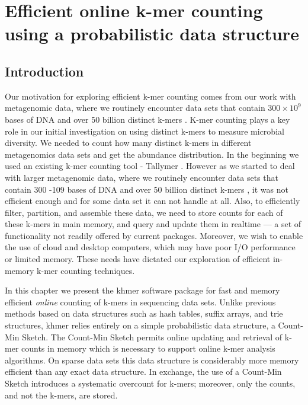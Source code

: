 \chapter{Efficient online k-mer counting using a probabilistic data structure}


\section{Introduction}

Our motivation for exploring efficient k-mer counting comes from our
work with metagenomic data, where we routinely encounter data sets
that contain $300 \times 10^9$ bases of DNA and over 50 billion
distinct k-mers \cite{Howe2012}. 
K-mer counting plays a key role in our initial investigation on using distinct 
k-mers to measure microbial diversity. We needed to count how many distinct 
k-mers in different metagenomics data sets and get the abundance distribution. 
In the beginning we used an existing k-mer counting tool - Tallymer \cite{Kurtz2008}
. However as we started to deal with 
larger metagenomic data, where we routinely encounter data sets that contain 
300 -109 bases of DNA and over 50 billion distinct k-mers \cite{Howe2012},
it was not efficient enough and for some data set it can not handle at all. 
 Also, to efficiently filter, partition,
and assemble these data, we need to store counts for each of these
k-mers in main memory, and query and update them in realtime --- a set
of functionality not readily offered by current packages.  Moreover,
we wish to enable the use of cloud and desktop computers, which may
have poor I/O performance or limited memory. These needs have dictated
our exploration of efficient in-memory k-mer counting techniques.

In this chapter we present the khmer
software package for fast and memory efficient {\em online} counting
of k-mers in sequencing data sets. Unlike previous methods based on
data structures such as hash tables, suffix arrays, and trie
structures, khmer relies entirely on a simple probabilistic data
structure, a Count-Min Sketch.  The Count-Min Sketch permits online
updating and retrieval of k-mer counts in memory which is necessary to
support online k-mer analysis algorithms.  On sparse data sets this
data structure is considerably more memory efficient than any exact
data structure.  In exchange, the use of a Count-Min Sketch introduces
a systematic overcount for k-mers; moreover, only the counts, and not
the k-mers, are stored.

